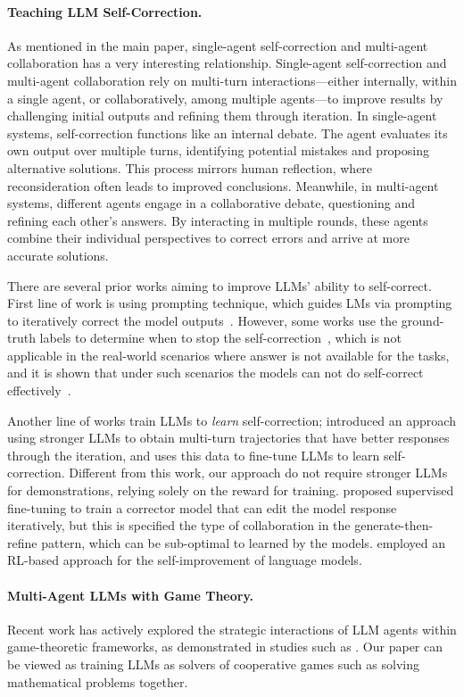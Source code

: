 \paragraph{Teaching LLM Self-Correction.}
As mentioned in the main paper, single-agent self-correction and multi-agent collaboration has a very interesting relationship. Single-agent self-correction and multi-agent collaboration rely on multi-turn interactions—either internally, within a single agent, or collaboratively, among multiple agents—to improve results by challenging initial outputs and refining them through iteration. In single-agent systems, self-correction functions like an internal debate. The agent evaluates its own output over multiple turns, identifying potential mistakes and proposing alternative solutions. This process mirrors human reflection, where reconsideration often leads to improved conclusions. Meanwhile, in multi-agent systems, different agents engage in a collaborative debate, questioning and refining each other’s answers. By interacting in multiple rounds, these agents combine their individual perspectives to correct errors and arrive at more accurate solutions. 

There are several prior works aiming to improve LLMs' ability to self-correct. First line of work is using prompting technique, which guides LMs via prompting to iteratively correct the model outputs~\citep{madaan2024self}. However, some works use the ground-truth labels to determine when to stop the self-correction~\citep{kim2024language, shinn2024reflexion, yao2022react}, which is not applicable in the real-world scenarios where answer is not available for the tasks, and it is shown that under such scenarios the models can not do self-correct effectively~\citep{huang2023large}.

Another line of works train LLMs to \textit{learn} self-correction; \citet{qu2024recursive} introduced an approach using stronger LLMs to obtain multi-turn trajectories that have better responses through the iteration, and uses this data to fine-tune LLMs to learn self-correction. Different from this work, our approach do not require stronger LLMs for demonstrations, relying solely on the reward for training. \citet{welleckgenerating} proposed supervised fine-tuning to train a corrector model that can edit the model response iteratively, but this is specified the type of collaboration in the  generate-then-refine pattern, which can be sub-optimal to learned by the models. \citet{kumar2024training} employed an RL-based approach for the self-improvement of language models.

\paragraph{Multi-Agent LLMs with Game Theory.} 
Recent work has actively explored the strategic interactions of LLM agents within game-theoretic frameworks, as demonstrated in studies such as  \citet{park2024llm,brookins2023playing, akata2023playing, lore2023strategic, fan2023can}. Our paper can be viewed as training LLMs as solvers of cooperative games such as solving mathematical problems together. 








